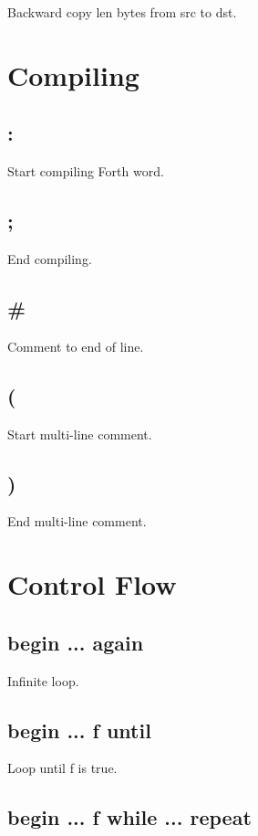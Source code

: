 Backward copy len bytes from src to dst.


\section{Compiling}

\subsection{:}

Start compiling Forth word.

\subsection{;}

End compiling.

\subsection{\#}

Comment to end of line.

\subsection{(}

Start multi-line comment.

\subsection{)}

End multi-line comment.


\section{Control Flow}

\subsection{begin ... again}

Infinite loop.

\subsection{begin ... f until}

Loop until f is true.

\subsection{begin ... f while ... repeat}

